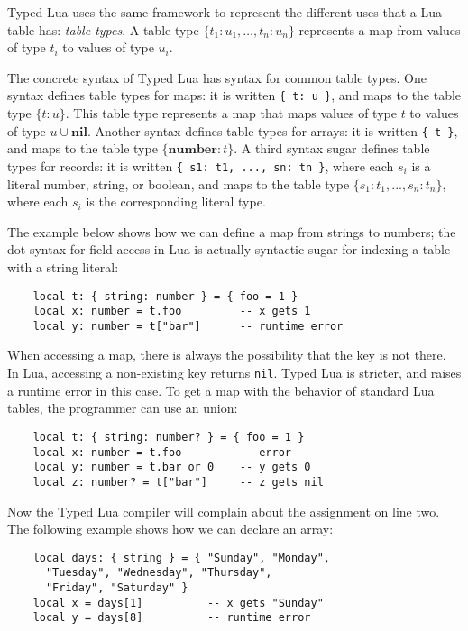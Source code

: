 \documentclass[preprint]{sig-alternate}
\newcommand{\Nil}{\mathbf{nil}}
\newcommand{\Number}{\mathbf{number}}
\begin{document}
Typed Lua uses the same framework to represent the different
uses that a Lua table has: {\em table types}. A table type
$\{ t_{1}:u_{1}, \ldots, t_{n}:u_{n}\}$ represents a map
from values of type $t_i$ to values of type $u_i$.

The concrete syntax of Typed Lua has syntax for
common table types. One syntax defines table types for
maps: it is written \texttt{\{ t: u \}},
and maps to the table type $\{t:u\}$.
This table type represents a map that maps values of type
$t$ to values of type $u \cup \Nil$.
Another syntax defines table types for arrays:
it is written \texttt{\{ t \}}, and maps to the table type
$\{\Number:t\}$. A third syntax sugar defines
table types for records:
it is written \texttt{\{ s1: t1, ..., sn: tn \}}, where
each $s_i$ is a literal number, string, or boolean, 
and maps to the table type $\{s_{1}:t_{1}, ..., s_{n}:t_{n}\}$,
where each $s_i$ is the corresponding literal type.

The example below shows how we can define a map from
strings to numbers; the dot syntax for field access
in Lua is actually syntactic sugar for indexing a table
with a string literal:

\begin{verbatim}
    local t: { string: number } = { foo = 1 }
    local x: number = t.foo         -- x gets 1
    local y: number = t["bar"]      -- runtime error
\end{verbatim}

When accessing a map, there is always the possibility that
the key is not there. In Lua, accessing a non-existing key
returns {\tt nil}. Typed Lua is stricter, and raises a runtime
error in this case. To get a map with the behavior of standard
Lua tables, the programmer can use an union:

\begin{verbatim}
    local t: { string: number? } = { foo = 1 }
    local x: number = t.foo         -- error
    local y: number = t.bar or 0    -- y gets 0
    local z: number? = t["bar"]     -- z gets nil
\end{verbatim}

Now the Typed Lua compiler will complain about the assignment
on line two. The following example shows how we can declare
an array:
\begin{verbatim}
    local days: { string } = { "Sunday", "Monday",
      "Tuesday", "Wednesday", "Thursday",
      "Friday", "Saturday" }
    local x = days[1]          -- x gets "Sunday"
    local y = days[8]          -- runtime error
\end{verbatim}
\end{document}
